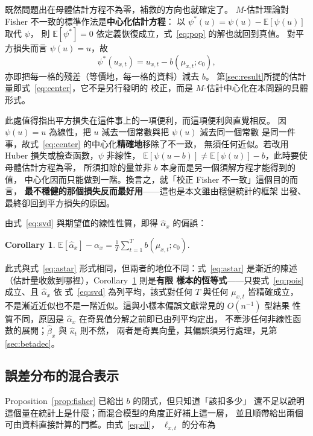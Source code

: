 \documentclass[UTF8, fontset=macnew, a4paper, 12pt]{ctexart}
\newtheorem{cor}{Corollary}
\newcommand{\Ex}{\mathbb{E}}
\begin{document}
既然問題出在母體估計方程不為零，補救的方向也就確定了。
$M$-估計理論對 Fisher 不一致的標準作法是\textbf{中心化估計方程}：
以 $\psi^{*}(u)=\psi(u)-\Ex[\psi(u)]$ 取代 $\psi$，
則 $\Ex[\psi^{*}]=0$ 依定義恢復成立，式~\eqref{eq:pop} 的解也就回到真值。
對平方損失而言 $\psi(u)=u$，故
\begin{equation}\label{eq:center}
\psi^{*}(u_{x,t})=u_{x,t}-b(\mu_{x,t};c_0),
\end{equation}
亦即把每一格的殘差（等價地，每一格的資料）減去 $b$。
第\ref{sec:result}所提的估計量即式~\eqref{eq:center}，它不是另行發明的
校正，而是 $M$-估計中心化在本問題的具體形式。

此處值得指出平方損失在這件事上的一項便利，而這項便利與直覺相反。
因 $\psi(u)=u$ 為線性，把 $u$ 減去一個常數與把 $\psi(u)$ 減去同一個常數
是同一件事，故式~\eqref{eq:center} 的中心化\textbf{精確地}移除了不一致，
無須任何近似。若改用 Huber 損失或檢查函數，$\psi$ 非線性，
$\Ex[\psi(u-b)]\ne\Ex[\psi(u)]-b$，此時要使母體估計方程為零，
所須扣除的量並非 $b$ 本身而是另一個須解方程才能得到的值，
中心化因而只能做到一階。換言之，就「校正 Fisher 不一致」這個目的而言，
\textbf{最不穩健的那個損失反而最好用}——這也是本文雖由穩健統計的框架
出發、最終卻回到平方損失的原因。

由式~\eqref{eq:svd} 與期望值的線性性質，即得 $\hat\alpha_x$ 的偏誤：

\begin{cor}\label{cor:alpha}
$\displaystyle \Ex[\hat\alpha_x]-\alpha_x=\frac{1}{T}\sum_{t=1}^{T} b(\mu_{x,t};c_0).$
\end{cor}

此式與式~\eqref{eq:astar} 形式相同，但兩者的地位不同：式~\eqref{eq:astar}
是漸近的陳述（估計量收斂到哪裡），Corollary~\ref{cor:alpha} 則是\textbf{有限
樣本的恆等式}——只要式~\eqref{eq:pois} 成立、且 $\hat\alpha_x$ 依
式~\eqref{eq:svd} 為列平均，該式對任何 $T$ 與任何 $\mu_{x,t}$ 皆精確成立，
不是漸近近似也不是一階近似。這與小樣本偏誤文獻常見的 $O(n^{-1})$ 型結果
性質不同，原因是 $\hat\alpha_x$ 在奇異值分解之前即已由列平均定出，
不牽涉任何非線性函數的展開；$\hat\beta_x$ 與 $\hat\kappa_t$ 則不然，
兩者是奇異向量，其偏誤須另行處理，見第\ref{sec:betadec}。

\subsection{誤差分布的混合表示}

Proposition~\ref{prop:fisher} 已給出 $b$ 的閉式，但只知道「該扣多少」
還不足以說明這個量在統計上是什麼；而混合模型的角度正好補上這一層，
並且順帶給出兩個可由資料直接計算的門檻。由式~\eqref{eq:ell}，
$\ell_{x,t}$ 的分布為
\end{document}

